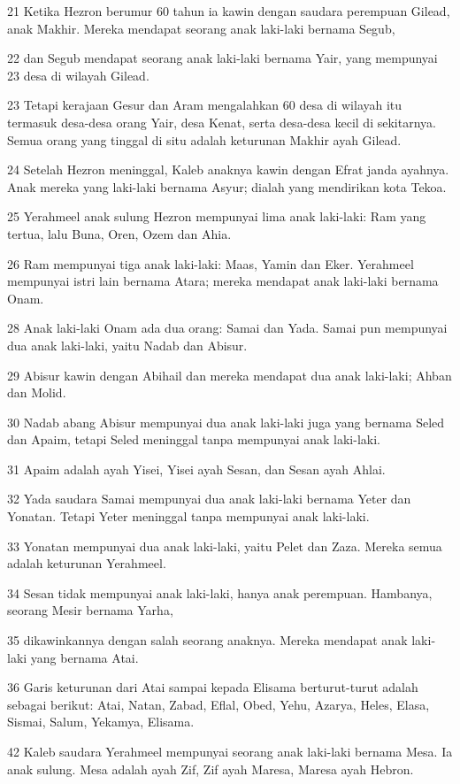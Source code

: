 \par 21 Ketika Hezron berumur 60 tahun ia kawin dengan saudara perempuan Gilead, anak Makhir. Mereka mendapat seorang anak laki-laki bernama Segub,
\par 22 dan Segub mendapat seorang anak laki-laki bernama Yair, yang mempunyai 23 desa di wilayah Gilead.
\par 23 Tetapi kerajaan Gesur dan Aram mengalahkan 60 desa di wilayah itu termasuk desa-desa orang Yair, desa Kenat, serta desa-desa kecil di sekitarnya. Semua orang yang tinggal di situ adalah keturunan Makhir ayah Gilead.
\par 24 Setelah Hezron meninggal, Kaleb anaknya kawin dengan Efrat janda ayahnya. Anak mereka yang laki-laki bernama Asyur; dialah yang mendirikan kota Tekoa.
\par 25 Yerahmeel anak sulung Hezron mempunyai lima anak laki-laki: Ram yang tertua, lalu Buna, Oren, Ozem dan Ahia.
\par 26 Ram mempunyai tiga anak laki-laki: Maas, Yamin dan Eker. Yerahmeel mempunyai istri lain bernama Atara; mereka mendapat anak laki-laki bernama Onam.
\par 28 Anak laki-laki Onam ada dua orang: Samai dan Yada. Samai pun mempunyai dua anak laki-laki, yaitu Nadab dan Abisur.
\par 29 Abisur kawin dengan Abihail dan mereka mendapat dua anak laki-laki; Ahban dan Molid.
\par 30 Nadab abang Abisur mempunyai dua anak laki-laki juga yang bernama Seled dan Apaim, tetapi Seled meninggal tanpa mempunyai anak laki-laki.
\par 31 Apaim adalah ayah Yisei, Yisei ayah Sesan, dan Sesan ayah Ahlai.
\par 32 Yada saudara Samai mempunyai dua anak laki-laki bernama Yeter dan Yonatan. Tetapi Yeter meninggal tanpa mempunyai anak laki-laki.
\par 33 Yonatan mempunyai dua anak laki-laki, yaitu Pelet dan Zaza. Mereka semua adalah keturunan Yerahmeel.
\par 34 Sesan tidak mempunyai anak laki-laki, hanya anak perempuan. Hambanya, seorang Mesir bernama Yarha,
\par 35 dikawinkannya dengan salah seorang anaknya. Mereka mendapat anak laki-laki yang bernama Atai.
\par 36 Garis keturunan dari Atai sampai kepada Elisama berturut-turut adalah sebagai berikut: Atai, Natan, Zabad, Eflal, Obed, Yehu, Azarya, Heles, Elasa, Sismai, Salum, Yekamya, Elisama.
\par 42 Kaleb saudara Yerahmeel mempunyai seorang anak laki-laki bernama Mesa. Ia anak sulung. Mesa adalah ayah Zif, Zif ayah Maresa, Maresa ayah Hebron.
